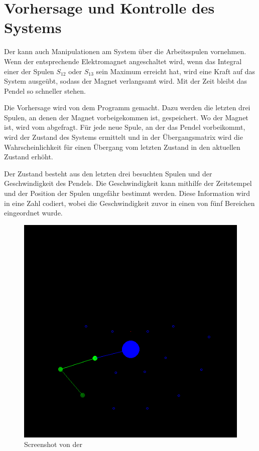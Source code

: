 \section{Vorhersage und Kontrolle des Systems}

Der  kann auch Manipulationen am System über die Arbeitsspulen vornehmen.
Wenn der entsprechende Elektromagnet angeschaltet wird, wenn das Integral einer der Spulen $S_{12}$ oder $S_{13}$ sein Maximum erreicht hat, wird eine Kraft auf das System ausgeübt, sodass der Magnet verlangsamt wird.
Mit der Zeit bleibt das Pendel so schneller stehen.

Die Vorhersage wird von dem Programm  gemacht.
Dazu werden die letzten drei Spulen, an denen der Magnet vorbeigekommen ist, gespeichert.
Wo der Magnet ist, wird vom  abgefragt.
Für jede neue Spule, an der das Pendel vorbeikommt, wird der Zustand des Systems ermittelt und in der Übergangsmatrix wird die Wahrscheinlichkeit für einen Übergang vom letzten Zustand in den aktuellen Zustand erhöht.

Der Zustand besteht aus den letzten drei besuchten Spulen und der Geschwindigkeit des Pendels.
Die Geschwindigkeit kann mithilfe der Zeitstempel und der Position der Spulen ungefähr bestimmt werden.
Diese Information wird in eine Zahl codiert, wobei die Geschwindigkeit zuvor in einen von fünf Bereichen eingeordnet wurde.

\begin{figure}[hbt]
  \centering
  \includegraphics[width=\textwidth]{images/prediction.png}
  \caption{Screenshot von der }
  \label{fig:screenmarkov}
\end{figure}

